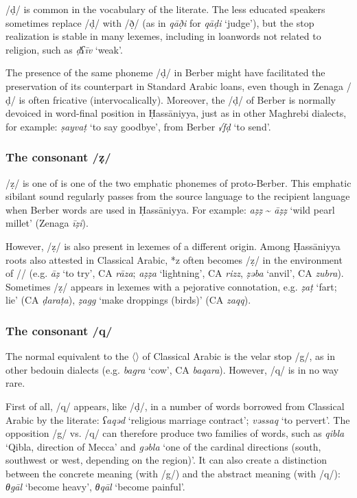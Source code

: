 \documentclass[output=paper]{langsci/langscibook}
\begin{document}
/ḍ/ is common in the vocabulary of the literate. The less educated speakers sometimes replace /ḍ/ with /ð̣/ (as in \textit{qāð̣i} for \textit{qāḍi} ‘judge’), but the stop realization is stable in many lexemes, including in loanwords not related to religion, such as \textit{ḍʕīv} ‘weak’.

The presence of the same phoneme /ḍ/ in Berber might have facilitated the preservation of its counterpart in Standard Arabic loans, even though in Zenaga /ḍ/ is often fricative (intervocalically). Moreover, the /ḍ/ of Berber is normally devoiced in word-final position in Ḥassāniyya, just as in other Maghrebi dialects, for example: \textit{ṣayvaṭ} ‘to say goodbye’, from Berber \textit{√fḍ} ‘to send’.

\subsubsection{ The consonant /ẓ/} %
/ẓ/ is one of is one of the two emphatic phonemes of proto-Berber. This emphatic sibilant sound regularly passes from the source language to the recipient language when Berber words are used in Ḥassāniyya. For example: \textit{aẓẓ} \~{} \textit{āẓẓ} ‘wild pearl millet’ (Zenaga \textit{īẓi}).

However, /ẓ/ is also present in lexemes of a different origin. Among Ḥassāniyya roots also attested in Classical Arabic, *z often becomes /ẓ/ in the environment of /{\R}/ (e.g. \textit{{\R}āẓ} ‘to try’, CA \textit{rāza}; \textit{{\R}aẓẓa} ‘lightning’, CA \textit{rizz}, \textit{ẓəb{\R}a} ‘anvil’, CA \textit{zubra}). Sometimes /ẓ/ appears in lexemes with a pejorative connotation, e.g. \textit{ẓ{\R}aṭ} ‘fart; lie’ (CA \textit{ḍaraṭa}), \textit{ẓagg} ‘make droppings (birds)’ (CA \textit{zaqq}).

\subsubsection{ The consonant /q/} %
The normal equivalent to the 〈{}〉 of Classical Arabic is the velar stop /g/, as in other bedouin dialects (e.g. \textit{bagra} ‘cow’, CA \textit{baqara}). However, /q/ is in no way rare.

First of all, /q/ appears, like /ḍ/, in a number of words borrowed from Classical Arabic by the literate: \textit{ʕaqəd} ‘religious marriage contract’; \textit{vəssaq} ‘to pervert’. The opposition /g/ vs. /q/ can therefore produce two families of words, such as \textit{qibla} ‘Qibla, direction of Mecca’ and \textit{gəbla} ‘one of the cardinal directions (south, southwest or west, depending on the region)’. It can also create a distinction between the concrete meaning (with /g/) and the abstract meaning (with /q/): \textit{θgāl} ‘become heavy’, \textit{θqāl} ‘become painful’.
\end{document}
